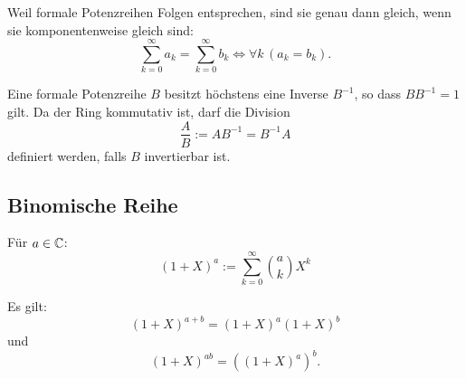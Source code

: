  Weil formale Potenzreihen
Folgen entsprechen, sind sie genau dann gleich, wenn sie
komponentenweise gleich sind:
\begin{equation}
\sum_{k=0}^\infty a_k = \sum_{k=0}^\infty b_k
\iff \forall k\,(a_k=b_k).
\end{equation}

Eine formale Potenzreihe $B$ besitzt höchstens eine Inverse $B^{-1}$,
so dass $BB^{-1}=1$ gilt. Da der Ring kommutativ ist, darf die
Division
\begin{equation}
\frac{A}{B} := AB^{-1} = B^{-1}A
\end{equation}
definiert werden, falls $B$ invertierbar ist.

\subsection{Binomische Reihe}
\begin{Definition}
Für $a\in\mathbb C$:
\begin{equation}
(1+X)^a := \sum_{k=0}^\infty \binom{a}{k} X^k
\end{equation}
\end{Definition}
\noindent
Es gilt:
\begin{equation}
(1+X)^{a+b} = (1+X)^a (1+X)^b 
\end{equation}
und
\begin{equation}
(1+X)^{ab} = ((1+X)^a)^b.
\end{equation}
